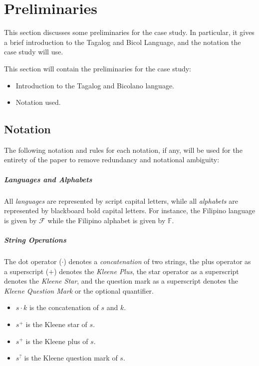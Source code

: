 \chapter{Preliminaries}
This section discusses some preliminaries for the case study. In particular, it gives a brief introduction to the Tagalog and Bicol Language, and the notation the case study will use.

{\color{blue}
This section will contain the preliminaries for the case study:

\begin{itemize}
    \item Introduction to the Tagalog and Bicolano language.
    \item Notation used.
\end{itemize}
}

\section{Notation}
The following notation and rules for each notation, if any, will be used for the entirety of the paper to remove redundancy and notational ambiguity:

\paragraph{Languages and Alphabets}
    All \emph{languages} are represented by script capital letters, while all \emph{alphabets} are represented by blackboard bold capital letters. For instance, the Filipino language is given by \(\mathcal{F}\) while the Filipino alphabet is given by \(\mathbb{F}\).

\paragraph{String Operations}
    The dot operator (\(\cdot\)) denotes a \emph{concatenation} of two strings, the plus operator as a superscript (\(+\)) denotes the \emph{Kleene Plus}, the star operator as a superscript denotes the \emph{Kleene Star}, and the question mark as a superscript denotes the \emph{Kleene Question Mark} or the optional quantifier.

\begin{itemize}
    \item $s\cdot k$ is the concatenation of $s$ and $k$.
    \item $s^+$ is the Kleene star of $s$.
    \item $s^+$ is the Kleene plus of $s$.
    \item $s^?$ is the Kleene question mark of $s$.
\end{itemize}

